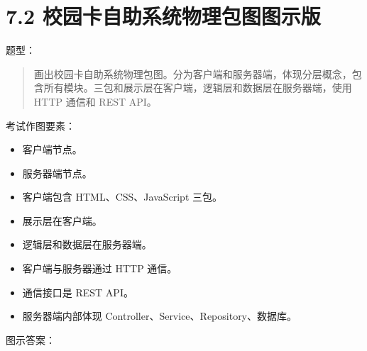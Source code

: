 \documentclass[UTF8,zihao=-4]{ctexart}
\begin{document}
\section{7.2 校园卡自助系统物理包图图示版}

题型：

\begin{quote}
画出校园卡自助系统物理包图。分为客户端和服务器端，体现分层概念，包含所有模块。三包和展示层在客户端，逻辑层和数据层在服务器端，使用 HTTP 通信和 REST API。
\end{quote}

考试作图要素：

\begin{itemize}
\item 客户端节点。
\item 服务器端节点。
\item 客户端包含 HTML、CSS、JavaScript 三包。
\item 展示层在客户端。
\item 逻辑层和数据层在服务器端。
\item 客户端与服务器通过 HTTP 通信。
\item 通信接口是 REST API。
\item 服务器端内部体现 Controller、Service、Repository、数据库。
\end{itemize}

图示答案：
\end{document}
